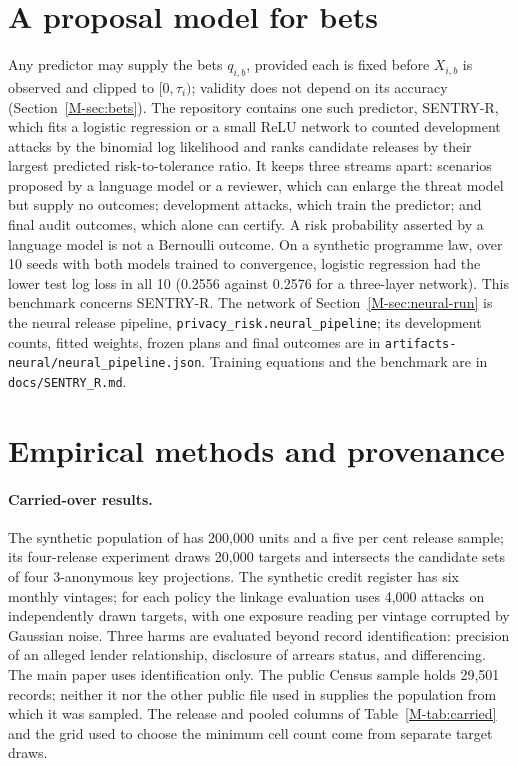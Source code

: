 \documentclass{jpc}
\begin{document}
\section{A proposal model for bets}\label{sec:network}
Any predictor may supply the bets $q_{i,b}$, provided each is fixed before $X_{i,b}$ is observed and clipped to $[0,\tau_i)$; validity does not depend on its accuracy (Section~\ref{M-sec:bets}). The repository contains one such predictor, SENTRY-R, which fits a logistic regression or a small ReLU network to counted development attacks by the binomial log likelihood and ranks candidate releases by their largest predicted risk-to-tolerance ratio. It keeps three streams apart: scenarios proposed by a language model or a reviewer, which can enlarge the threat model but supply no outcomes; development attacks, which train the predictor; and final audit outcomes, which alone can certify. A risk probability asserted by a language model is not a Bernoulli outcome. On a synthetic programme law, over 10 seeds with both models trained to convergence, logistic regression had the lower test log loss in all 10 (0.2556 against 0.2576 for a three-layer network). This benchmark concerns SENTRY-R. The network of Section~\ref{M-sec:neural-run} is the neural release pipeline, \nolinkurl{privacy_risk.neural_pipeline}; its development counts, fitted weights, frozen plans and final outcomes are in \nolinkurl{artifacts-neural/neural_pipeline.json}. Training equations and the benchmark are in \nolinkurl{docs/SENTRY_R.md}.

\section{Empirical methods and provenance}\label{sec:s-methods}
\paragraph{Carried-over results.} The synthetic population of \cite{mahomane2026} has 200,000 units and a five per cent release sample; its four-release experiment draws 20,000 targets and intersects the candidate sets of four 3-anonymous key projections. The synthetic credit register has six monthly vintages; for each policy the linkage evaluation uses 4,000 attacks on independently drawn targets, with one exposure reading per vintage corrupted by Gaussian noise. Three harms are evaluated beyond record identification: precision of an alleged lender relationship, disclosure of arrears status, and differencing. The main paper uses identification only. The public Census sample holds 29,501 records; neither it nor the other public file used in \cite{mahomane2026} supplies the population from which it was sampled. The release and pooled columns of Table~\ref{M-tab:carried} and the grid used to choose the minimum cell count come from separate target draws.
\end{document}

